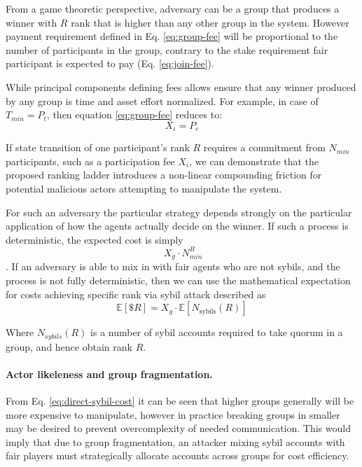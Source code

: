 \documentclass{article}
\begin{document}
\begin{CJK}{UTF8}{gbsn}
    From a game theoretic perspective, adversary can be a group that produces a winner with $R$ rank that is higher than any other group in the system. However payment requirement defined in Eq. \ref{eq:group-fee} will be proportional to the number of participants in the group, contrary to the stake requirement fair participant is expected to pay (Eq. \ref{eq:join-fee}).

    While principal components defining fees allows ensure that any winner produced by any group is time and asset effort normalized.
    For example, in case of $T_{min} = P_t$, then equation \ref{eq:group-fee} reduces to:
    \begin{equation}
        \label{eq:join-fee-2}
        X_i = P_c
    \end{equation}

    If state transition of one participant's rank $R$ requires a commitment from $N_{min}$ participants, such as a participation fee $X_i$, we can demonstrate that the proposed ranking ladder introduces a non-linear compounding friction for potential malicious actors attempting to manipulate the system.

    For such an adversary the particular strategy depends strongly on the particular application of how the agents actually decide on the winner. If such a process is deterministic, the expected cost is simply
    \begin{equation}\
        \label{eq:direct-sybil-cost}
        X_g \cdot N_{min}^R
    \end{equation}. If an adversary is able to mix in with fair agents who are not sybils, and the process is not fully deterministic, then we can use the mathematical expectation for costs achieving specific rank via sybil attack described as
    \begin{equation}
        \mathbb{E}[\$R] = X_g \cdot \mathbb{E}[N_{\text{sybils}}(R)]
    \end{equation}

    Where $N_{sybils}(R)$ is a number of sybil accounts required to take quorum in a group, and hence obtain rank $R$.

    \paragraph{Actor likeleness and group fragmentation.}
    From Eq. \ref{eq:direct-sybil-cost} it can be seen that higher groups generally will be more expensive to manipulate, however in practice breaking groups in smaller may be desired to prevent overcomplexity of needed communication. This would imply that due to group fragmentation, an attacker mixing sybil accounts with fair players must strategically allocate accounts across groups for cost efficiency.


\end{CJK}
\end{document}
